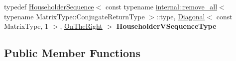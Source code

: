 \begin{DoxyCompactItemize}
\item 
\mbox{\label{class_eigen_1_1internal_1_1_upper_bidiagonalization_aa93645d9dfab0b02287e8b66b4018007}} 
typedef \hyperlink{group___householder___module_class_eigen_1_1_householder_sequence}{Householder\+Sequence}$<$ const typename \hyperlink{struct_eigen_1_1internal_1_1remove__all}{internal\+::remove\+\_\+all}$<$ typename Matrix\+Type\+::\+Conjugate\+Return\+Type $>$\+::type, \hyperlink{group___core___module_class_eigen_1_1_diagonal}{Diagonal}$<$ const Matrix\+Type, 1 $>$, \hyperlink{group__enums_ggac22de43beeac7a78b384f99bed5cee0ba99dc75d8e00b6c3a5bdc31940f47492b}{On\+The\+Right} $>$ {\bfseries Householder\+V\+Sequence\+Type}
\end{DoxyCompactItemize}
\subsection*{Public Member Functions}
